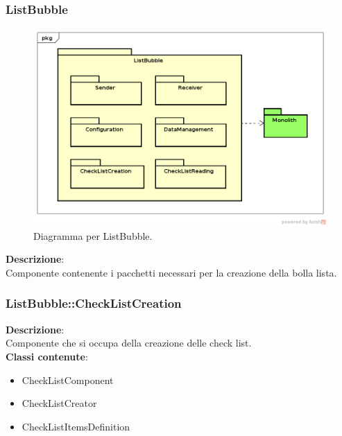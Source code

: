 \subsubsection{ListBubble}
   \FloatBarrier
   \begin{figure}[ht]
   \centering
\includegraphics[width=\textwidth,keepaspectratio]{img/listchecklistTop}
   \caption{Diagramma per ListBubble.}
\end{figure}
\FloatBarrier
\textbf{Descrizione}:\\
 Componente contenente i pacchetti necessari per la creazione della bolla lista. 


\clearpage

\subsubsection{ListBubble::CheckListCreation}
   \FloatBarrier
\FloatBarrier
\textbf{Descrizione}:\\
 Componente che si occupa della creazione delle check list. 
\\ \textbf{Classi contenute}:\\
\begin{itemize}
\item CheckListComponent
\item CheckListCreator
\item CheckListItemsDefinition
\end{itemize}


